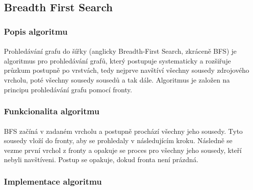 \documentclass[12pt]{article}
\begin{document}
\subsection{Breadth First Search}
\subsubsection{Popis algoritmu}
\paragraph{}
Prohledávání grafu do šířky (anglicky Breadth-First Search, zkráceně BFS) je algoritmus 
pro prohledávání grafů, který postupuje systematicky a rozšiřuje průzkum postupně po 
vrstvách, tedy nejprve navštíví všechny sousedy zdrojového vrcholu, poté všechny sousedy 
sousedů a tak dále. Algoritmus je založen na principu prohledávání grafu pomocí fronty.
\subsubsection{Funkcionalita algoritmu}
\paragraph{}
BFS začíná v zadaném vrcholu a postupně prochází všechny jeho sousedy. Tyto sousedy 
vloží do fronty, aby se prohledaly v následujícím kroku. Následně se vezme první vrchol 
z fronty a opakuje se proces pro všechny jeho sousedy, kteří nebyli navštíveni. Postup se 
opakuje, dokud fronta není prázdná.
\subsubsection{Implementace algoritmu}
\end{document}
